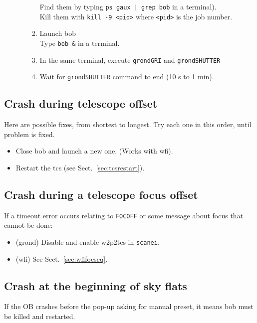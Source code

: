 \documentclass[11pt,fleqn]{book} %
\begin{document}
\begin{enumerate}
\begin{enumerate}
\begin{enumerate}
                   Find them by typing \texttt{ps gaux | grep bob} in a terminal).\\
                   Kill them with \texttt{kill -9 <pid>} where \texttt{<pid>} is the job number.
             \item Launch \gls{bob}\\  
                   Type \texttt{bob \&} in a terminal.
             \item In the same terminal, execute \texttt{grondGRI} and \texttt{grondSHUTTER}
             \item Wait for \texttt{grondSHUTTER} command to end (10 s to 1 min).
             \end{enumerate}
  \end{enumerate}
\end{enumerate}

\subsection{Crash during telescope offset}

Here are possible fixes, from shortest to longest.  Try each one in this
order, until problem is fixed.
\begin{itemize}
  \item Close \gls{bob} and launch a new one. (Works with \gls{wfi}).
  \item Restart the \gls{tcs} (see Sect.~\ref{sec:tcsrestart}).
\end{itemize}

\subsection{Crash during a telescope focus offset}
If a timeout error occurs relating to \texttt{FOCOFF} or some message about
focus that cannot be done:
\begin{itemize}
  \item (\gls{grond}) Disable and enable w2p2tcs in \texttt{scanei}.
  \item (\gls{wfi}) See Sect.~\ref{sec:wfifocseq}.
\end{itemize}

\subsection{Crash at the beginning of sky flats}
If the OB crashes before the pop-up asking for manual preset, it means
bob must be killed and restarted.
\end{document}
